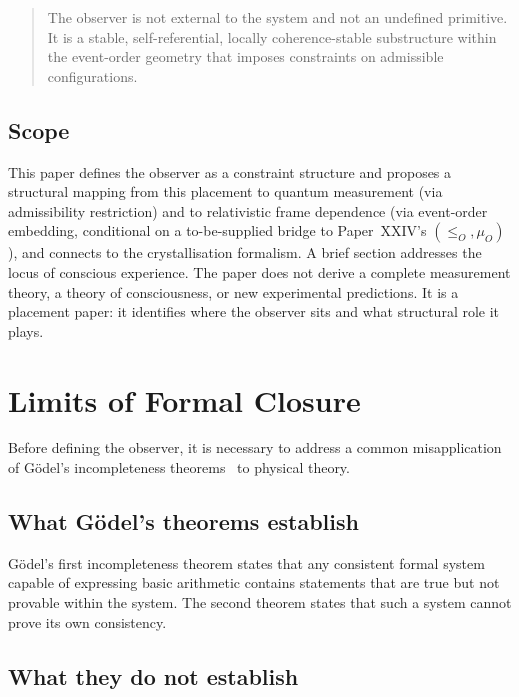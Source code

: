 \documentclass[12pt]{article}
\begin{document}
\begin{quote}
The observer is not external to the system and not an undefined primitive. It is a stable, self-referential, locally coherence-stable substructure within the event-order geometry that imposes constraints on admissible configurations.
\end{quote}

\subsection*{Scope}

This paper defines the observer as a constraint structure and proposes a structural mapping from this placement to quantum measurement (via admissibility restriction) and to relativistic frame dependence (via event-order embedding, conditional on a to-be-supplied bridge to Paper~XXIV's $(\leq_O, \mu_O)$), and connects to the crystallisation formalism. A brief section addresses the locus of conscious experience. The paper does not derive a complete measurement theory, a theory of consciousness, or new experimental predictions. It is a placement paper: it identifies where the observer sits and what structural role it plays.

\section{Limits of Formal Closure}\label{sec:godel}

Before defining the observer, it is necessary to address a common misapplication of G\"odel's incompleteness theorems~\citep{Godel1931} to physical theory.

\subsection{What G\"odel's theorems establish}

G\"odel's first incompleteness theorem states that any consistent formal system capable of expressing basic arithmetic contains statements that are true but not provable within the system. The second theorem states that such a system cannot prove its own consistency.

\subsection{What they do not establish}
\end{document}
